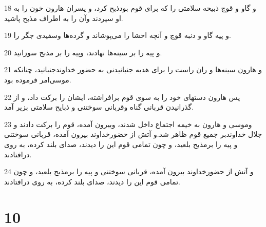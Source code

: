\par 18 و گاو و قوچ ذبیحه سلامتی را که برای قوم بودذبح کرد، و پسران هارون خون را به او سپردند وآن را به اطراف مذبح پاشید.
\par 19 و پیه گاو و دنبه قوچ و آنچه احشا را می‌پوشاند و گرده‌ها وسفیدی جگر را.
\par 20 و پیه را بر سینه‌ها نهادند، وپیه را بر مذبح سوزانید.
\par 21 و هارون سینه‌ها و ران راست را برای هدیه جنبانیدنی به حضور خداوندجنبانید، چنانکه موسی‌امر فرموده بود.
\par 22 پس هارون دستهای خود را به سوی قوم برافراشته، ایشان را برکت داد، و از گذرانیدن قربانی گناه وقربانی سوختنی و ذبایح سلامتی بزیر آمد.
\par 23 وموسی و هارون به خیمه اجتماع داخل شدند، وبیرون آمده، قوم را برکت دادند و جلال خداوندبر جمیع قوم ظاهر شد.و آتش از حضورخداوند بیرون آمده، قربانی سوختنی و پیه را برمذبح بلعید، و چون تمامی قوم این را دیدند، صدای بلند کرده، به روی در‌افتادند.
\par 24 و آتش از حضورخداوند بیرون آمده، قربانی سوختنی و پیه را برمذبح بلعید، و چون تمامی قوم این را دیدند، صدای بلند کرده، به روی در‌افتادند.
 
\chapter{10}

